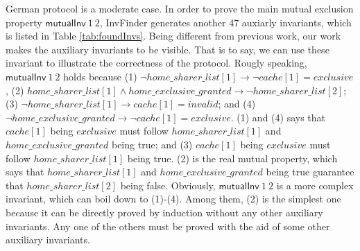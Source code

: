 \documentclass{llncs}
\begin{document}
German protocol is a moderate case. In order to prove  the main mutual exclusion
property $\mathsf{mutualInv}~1~2$, {\sf InvFinder} generates  another 47 auxiarly invariants, which is listed in Table \ref{tab:foundInvs}. Being different from previous work, our work makes the auxiliary invariants to be visible. That is to say, we can use these invariant to illustrate the correctness of the protocol. Rougly speaking, $\mathsf{mutualInv}~1~2$ holds because (1) $\lnot home\_sharer\_list[1]\longrightarrow \lnot cache[1]=exclusive$, (2) $home\_sharer\_list[1]\wedge home\_exclusive\_granted
\longrightarrow \lnot home\_sharer\_list[2]$; (3) $\lnot home\_sharer\_list[1]\longrightarrow   cache[1]=invalid$; and (4) $\lnot home\_exclusive\_granted\longrightarrow \lnot cache[1]=exclusive$. (1) and (4) says that $cache[1]$ being $ exclusive$ must follow $home\_sharer\_list[1]$ and $home\_exclusive\_granted$ being true; and (3) $cache[1]$ being $ exclusive$ must follow $home\_sharer\_list[1]$ being true. (2) is the real mutual property, which says that $home\_sharer\_list[1]$ and $ home\_exclusive\_granted$ being true guarantee that $home\_sharer\_list[2]$ being false. Obviously, $\mathsf{mutualInv}~1~2$ is a more complex invariant, which can boil down to (1)-(4). Among them, (2) is the simplest one because it can be directly proved by induction without any other auxiliary invariants. Any one of the others must be proved with the aid of some other auxiliary invariants.
\end{document}
